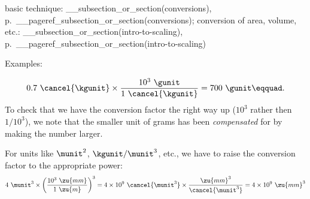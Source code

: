 basic technique: __subsection_or_section(conversions), p.~__pageref_subsection_or_section(conversions);
conversion of area, volume, etc.: __subsection_or_section(intro-to-scaling), p.~__pageref_subsection_or_section(intro-to-scaling)

Examples:

\begin{equation*}
  0.7\ \cancel{\kgunit} \times \frac{10^3\ \gunit}{1\ \cancel{\kgunit}}  = 700\ \gunit\eqquad.
\end{equation*}
To check that we have the conversion factor the right way up ($10^3$ rather then $1/10^3$), we note
that the smaller unit of grams has been \emph{compensated} for by making the number larger.

For units like $\munit^2$, $\kgunit/\munit^3$, etc., we have to raise the conversion factor to the appropriate power:
\begin{equation*}
  4\ \munit^3 \times \left(\frac{10^3\ \zu{mm}}{1\ \zu{m}}\right)^3 = 4\times10^9\ \cancel{\munit^3} \times \frac{\zu{mm}^3}{\cancel{\munit^3}} = 4\times10^9\ \zu{mm}^3
\end{equation*}
